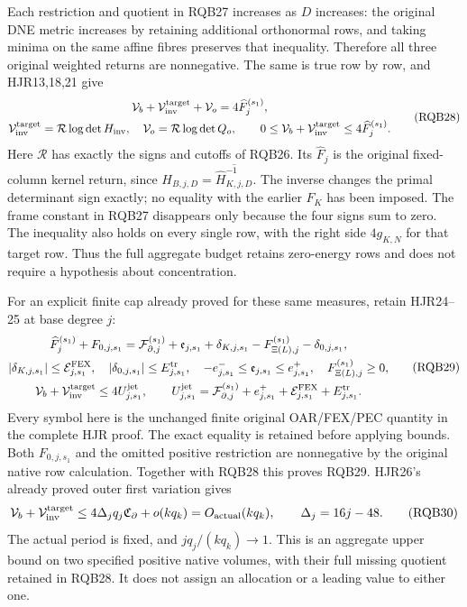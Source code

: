 \documentclass[11pt,a4paper]{article}
\begin{document}
Each restriction and quotient in RQB27 increases as $D$ increases:
the original DNE metric increases by retaining additional orthonormal
rows, and taking minima on the same affine fibres preserves that
inequality. Therefore all three original weighted returns are
nonnegative. The same is true row by row, and HJR13,18,21 give
\[
\begin{gathered}
 \mathcal V_b+\mathcal V_{\rm inv}^{\rm target}+\mathcal V_o
               =4\widehat F_j^{(s_1)},\\
 \mathcal V_{\rm inv}^{\rm target}
       =\mathcal R\log\det H_{\rm inv},\quad
 \mathcal V_o=\mathcal R\log\det Q_o,\qquad
 0\le\mathcal V_b+\mathcal V_{\rm inv}^{\rm target}
                         \le4\widehat F_j^{(s_1)} .
\end{gathered}\tag{RQB28}
\]
Here $\mathcal R$ has exactly the signs and cutoffs of RQB26.
Its $\widehat F_j$ is the original fixed-column kernel return,
since $H_{B,j,D}=\overline{\widehat H_{K,j,D}^{-1}}$.
The inverse changes the primal determinant sign exactly;
no equality with the earlier $F_K$ has been imposed.
The frame constant in RQB27 disappears only because the four
signs sum to zero. The inequality also holds on every single
row, with the right side $4g_{K,N}$ for that target row.
Thus the full aggregate budget retains zero-energy rows and
does not require a hypothesis about concentration.

For an explicit finite cap already proved for these same measures,
retain HJR24--25 at base degree $j$:
\[
\begin{gathered}
 \widehat F_j^{(s_1)}+F_{0,j,s_1}
 =\mathcal F_{\partial,j}^{(s_1)}+\mathfrak e_{j,s_1}
       +\delta_{K,j,s_1}-F_{\Xi(L),j}^{(s_1)}-\delta_{0,j,s_1},\\
 |\delta_{K,j,s_1}|\le\mathcal E_{j,s_1}^{\rm FEX},\quad
 |\delta_{0,j,s_1}|\le E_{j,s_1}^{\rm tr},\quad
 -e_{j,s_1}^-\le\mathfrak e_{j,s_1}\le e_{j,s_1}^+,\quad
 F_{\Xi(L),j}^{(s_1)}\ge0,\\
 \mathcal V_b+\mathcal V_{\rm inv}^{\rm target}
  \le4U_{j,s_1}^{\rm jet},\qquad
 U_{j,s_1}^{\rm jet}
 =\mathcal F_{\partial,j}^{(s_1)}
       +e_{j,s_1}^++\mathcal E_{j,s_1}^{\rm FEX}+E_{j,s_1}^{\rm tr}.
\end{gathered}\tag{RQB29}
\]
Every symbol here is the unchanged finite original OAR/FEX/PEC
quantity in the complete HJR proof. The exact equality is retained
before applying bounds. Both $F_{0,j,s_1}$ and the omitted positive
restriction are nonnegative by the original native row calculation.
Together with RQB28 this proves RQB29. HJR26's already proved
outer first variation gives
\[
 \mathcal V_b+\mathcal V_{\rm inv}^{\rm target}
   \le4\Delta_jq_j\mathfrak C_\partial+o(kq_k)
                =O_{\rm actual}(kq_k),\qquad \Delta_j=16j-48 .
 \tag{RQB30}
\]
The actual period is fixed, and $j q_j/(kq_k)\to1$.
This is an aggregate upper bound on two specified positive
native volumes, with their full missing quotient retained in RQB28.
It does not assign an allocation or a leading value to either one.
\end{document}
